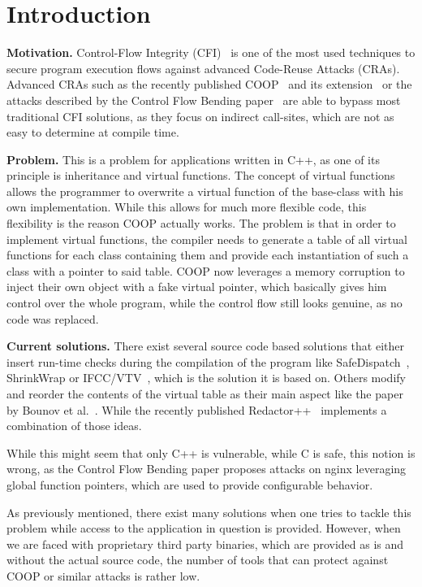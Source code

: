 \section{Introduction}
\label{chapter:Introduction}

\textbf{Motivation.}
\label{Motivation}
Control-Flow Integrity (CFI)~\cite{abadi:cfi2, abadi:cfi} is one of the most used techniques to secure program execution 
flows against advanced Code-Reuse Attacks (CRAs). Advanced CRAs such as the recently published COOP~\cite{schuster:coop} 
and its extension~\cite{crane:readactor++} or the attacks described by the Control Flow Bending paper~\cite{carlini:bending}
are able to bypass most traditional CFI solutions, as they focus on indirect call-sites, which are not as easy to determine at compile time.

\textbf{Problem.} This is a problem for applications written in C++, as one of its principle is inheritance and virtual functions. 
The concept of virtual functions allows the programmer to overwrite a virtual function of the base-class with his
own implementation. While this allows for much more flexible code, this flexibility is the reason COOP actually 
works. The problem is that in order to implement virtual functions, the compiler needs to generate a table of all
virtual functions for each class containing them and provide each instantiation of such a class with a pointer
to said table. COOP now leverages a memory corruption to inject their own object with a fake virtual pointer, 
which basically gives him control over the whole program, while the control flow still looks genuine, as no 
code was replaced. 

\textbf{Current solutions.} There exist several source code based solutions that either insert run-time checks during the compilation of 
the program like SafeDispatch~\cite{safedispatch:jang}, ShrinkWrap \cite{haller:shrinkwrap} or IFCC/VTV~\cite{vtv:tice}, 
which is the solution it is based on. Others modify and reorder the contents of the virtual table as their main 
aspect like the paper by Bounov et al.~\cite{bounov:interleaving}. While the recently published Redactor++~\cite{crane:readactor++}
implements a combination of those ideas.

While this might seem that only C++ is vulnerable, while C is safe, this notion is wrong, as the 
Control Flow Bending paper \cite{carlini:bending} proposes attacks on nginx leveraging global 
function pointers, which are used to provide configurable behavior.

As previously mentioned, there exist many solutions when one tries to tackle this problem while access
to the application in question is provided. However, when we are faced with proprietary third party 
binaries, which are provided as is and without the actual source code, the number of tools that can
protect against COOP or similar attacks is rather low.

